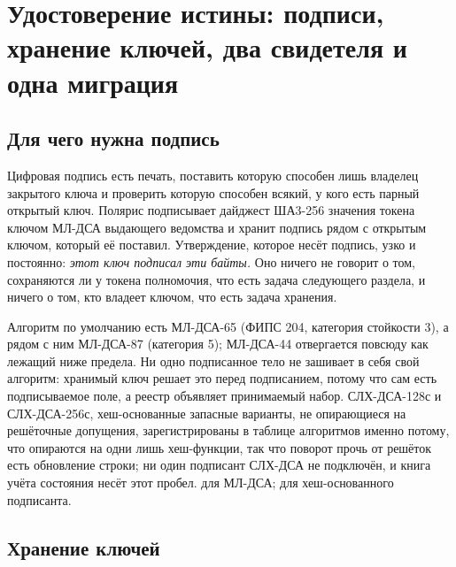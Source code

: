 \section{Удостоверение истины: подписи, хранение ключей, два свидетеля и одна миграция}
\label{sec:signatures}



\subsection{Для чего нужна подпись}

Цифровая подпись есть печать, поставить которую способен лишь владелец закрытого ключа и проверить
которую способен всякий, у кого есть парный открытый ключ. Полярис подписывает дайджест ША3-256
значения токена ключом МЛ-ДСА выдающего ведомства и хранит подпись рядом с открытым ключом,
который её поставил. Утверждение, которое несёт подпись, узко и постоянно: \emph{этот ключ
подписал эти байты.} Оно ничего не говорит о том, сохраняются ли у токена полномочия, что есть
задача следующего раздела, и ничего о том, кто владеет ключом, что есть задача хранения. \sImpl

Алгоритм по умолчанию есть МЛ-ДСА-65 (ФИПС 204, категория стойкости 3), а рядом с ним МЛ-ДСА-87
(категория 5); МЛ-ДСА-44 отвергается повсюду как лежащий ниже предела. Ни одно подписанное тело не
зашивает в себя свой алгоритм: хранимый ключ решает это перед подписанием, потому что
 сам есть подписываемое поле, а реестр объявляет принимаемый набор. СЛХ-ДСА-128с и
СЛХ-ДСА-256с, хеш-основанные запасные варианты, не опирающиеся на решёточные допущения,
зарегистрированы в таблице алгоритмов именно потому, что опираются на одни лишь хеш-функции, так
что поворот прочь от решёток есть обновление строки; ни один подписант СЛХ-ДСА не подключён, и
книга учёта состояния несёт этот пробел. \sImplMark{} для МЛ-ДСА; \sFut{} для хеш-основанного
подписанта.

\subsection{Хранение ключей}

